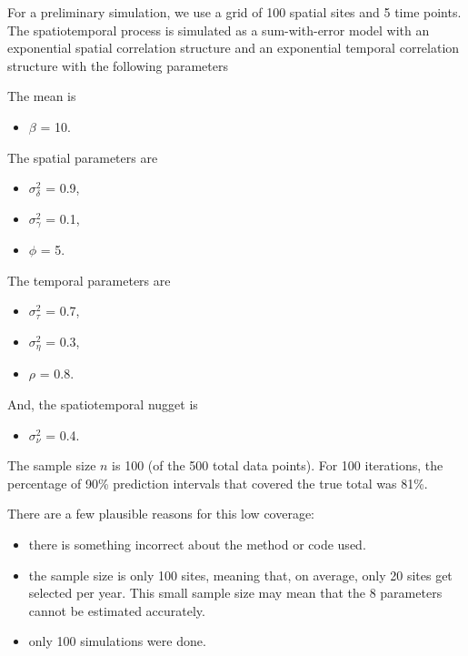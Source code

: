 \documentclass[]{interact}
\theoremstyle{plain}%
\theoremstyle{definition}
\theoremstyle{remark}
\def\tightlist{}
\begin{document}
For a preliminary simulation, we use a grid of 100 spatial sites and 5
time points. The spatiotemporal process is simulated as a sum-with-error
model with an exponential spatial correlation structure and an
exponential temporal correlation structure with the following parameters

The mean is

\begin{itemize}
\tightlist
\item
  \(\beta\) = 10.
\end{itemize}

The spatial parameters are

\begin{itemize}
\tightlist
\item
  \(\sigma^2_{\delta}\) = 0.9,
\item
  \(\sigma^2_{\gamma}\) = 0.1,
\item
  \(\phi\) = 5.
\end{itemize}

The temporal parameters are

\begin{itemize}
\tightlist
\item
  \(\sigma^2_{\tau}\) = 0.7,
\item
  \(\sigma^2_{\eta}\) = 0.3,
\item
  \(\rho\) = 0.8.
\end{itemize}

And, the spatiotemporal nugget is

\begin{itemize}
\tightlist
\item
  \(\sigma^2_{\nu}\) = 0.4.
\end{itemize}

The sample size \(n\) is 100 (of the 500 total data points). For 100
iterations, the percentage of 90\% prediction intervals that covered the
true total was 81\%.

There are a few plausible reasons for this low coverage:

\begin{itemize}
\tightlist
\item
  there is something incorrect about the method or code used.
\item
  the sample size is only 100 sites, meaning that, on average, only 20
  sites get selected per year. This small sample size may mean that the
  8 parameters cannot be estimated accurately.
\item
  only 100 simulations were done.
\end{itemize}
\end{document}
